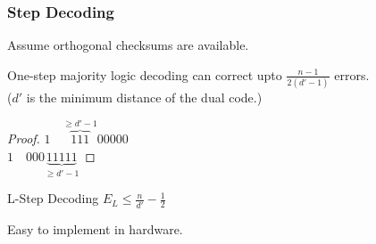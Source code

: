 \documentclass[xcolor=xvgnames]{beamer}
\begin{document}
\begin{frame}
  \frametitle{Step Decoding}
Assume orthogonal checksums are available.
\begin{Theorem}
One-step majority logic decoding can correct upto $\frac{n-1}{2(d'-1)}$ errors.\\
($d'$ is the minimum distance of the dual code.)
\begin{proof} 
$1 \quad \overbrace{1 1 1}^{\geq d'-1}  0 0 0 0 0 $ \\
$1 \quad 0 0 0  \underbrace{1 1 1 1 1}_{\geq d'-1} $

\end{proof}
\end{Theorem}  

\begin{block}{L-Step Decoding}
$E_L \leq \frac{n}{d'} - \frac{1}{2} $ 




\end{block}


Easy to implement in hardware.

\end{frame}

\end{document}
